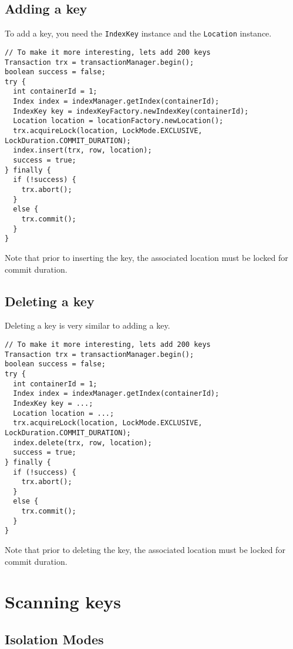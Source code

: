 \documentclass[a4paper,draft,oneside]{book}
\begin{document}
\subsection{Adding a key}

To add a key, you need the \verb|IndexKey| instance and the \verb|Location| instance.

\begin{verbatim}
// To make it more interesting, lets add 200 keys
Transaction trx = transactionManager.begin();
boolean success = false;
try {
  int containerId = 1;
  Index index = indexManager.getIndex(containerId);
  IndexKey key = indexKeyFactory.newIndexKey(containerId);
  Location location = locationFactory.newLocation();
  trx.acquireLock(location, LockMode.EXCLUSIVE, LockDuration.COMMIT_DURATION);
  index.insert(trx, row, location);
  success = true;
} finally {
  if (!success) {
    trx.abort();
  }
  else {
    trx.commit();
  }
}
\end{verbatim}

Note that prior to inserting the key, the associated location must be
locked for commit duration. 

\subsection{Deleting a key}

Deleting a key is very similar to adding a key.

\begin{verbatim}
// To make it more interesting, lets add 200 keys
Transaction trx = transactionManager.begin();
boolean success = false;
try {
  int containerId = 1;
  Index index = indexManager.getIndex(containerId);
  IndexKey key = ...;
  Location location = ...;
  trx.acquireLock(location, LockMode.EXCLUSIVE, LockDuration.COMMIT_DURATION);
  index.delete(trx, row, location);
  success = true;
} finally {
  if (!success) {
    trx.abort();
  }
  else {
    trx.commit();
  }
}
\end{verbatim}

Note that prior to deleting the key, the associated location must be
locked for commit duration. 

\section{Scanning keys}

\subsection{Isolation Modes}
\end{document}
